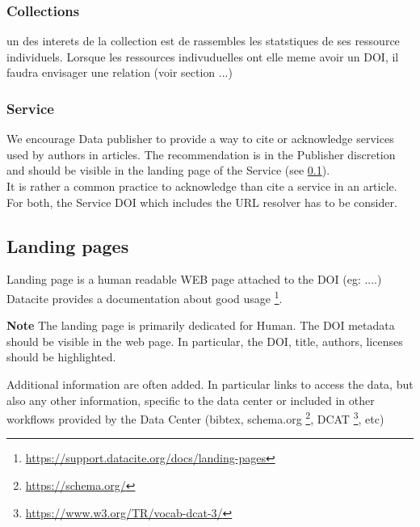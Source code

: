\documentclass[11pt,a4paper]{ivoa}
\newcommand{\important}[1]{
	\begin{bigdescription}
		\item \color{ivoacolor}\textbf{Note} #1
	\end{bigdescription}
}
\begin{document}
\subsubsection{Collections}
un des interets de la collection est de rassembles les statstiques de ses ressource individuels. Lorsque les ressources indivuduelles ont elle meme avoir un DOI, il faudra envisager une relation (voir section ...)

\subsubsection{Service}
We encourage Data publisher to provide a way to cite or acknowledge services used by authors in articles. The recommendation is in the Publisher discretion and should be visible in the landing page of the Service (see \ref{sec:landingpage}).\\

It is rather a common practice to acknowledge than cite a service in an article. For both, the Service DOI which includes the URL resolver has to be consider.

\subsection{Landing pages}
\label{sec:landingpage}
Landing page is a human readable WEB page attached to the DOI (eg: ....) Datacite provides a documentation about good usage \footnote{\url{https://support.datacite.org/docs/landing-pages}}.

\important{
	The landing page is primarily dedicated for Human. 
	The DOI metadata should be visible in the web page. In particular, 
	the DOI, title, authors, licenses should be highlighted.
}



Additional information are often added. In particular links to access the data, but also any other information, specific to the data center or included in other workflows provided by the Data Center (bibtex, schema.org \footnote{\url{https://schema.org/}}, DCAT \footnote{\url{https://www.w3.org/TR/vocab-dcat-3/}}, etc)
\end{document}

